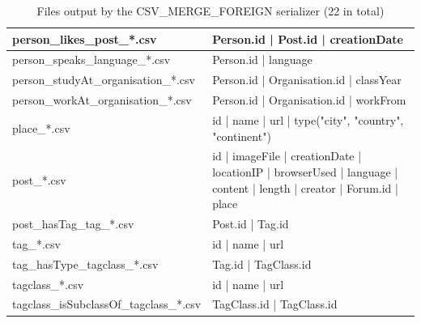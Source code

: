 \begin{table}[htbp]
{\begin{tabular}{|p{4.3cm}|p{12.4cm}|}
    	person\_likes\_post\_*.csv              & Person.id | Post.id | creationDate                                                                                  \\ \hline
    	person\_speaks\_language\_*.csv         & Person.id | language                                                                                                \\ \hline
    	person\_studyAt\_organisation\_*.csv    & Person.id | Organisation.id | classYear                                                                             \\ \hline
    	person\_workAt\_organisation\_*.csv     & Person.id | Organisation.id | workFrom                                                                              \\ \hline
    	place\_*.csv                            & id | name | url | type({"city", "country", "continent"})                                                            \\ \hline
    	post\_*.csv                             & id | imageFile | creationDate | locationIP | browserUsed | language | content | length | creator | Forum.id | place \\ \hline
    	post\_hasTag\_tag\_*.csv                & Post.id | Tag.id                                                                                                    \\ \hline
    	tag\_*.csv                              & id | name | url                                                                                                     \\ \hline
    	tag\_hasType\_tagclass\_*.csv           & Tag.id | TagClass.id                                                                                                \\ \hline
    	tagclass\_*.csv                         & id | name | url                                                                                                     \\ \hline
    	tagclass\_isSubclassOf\_tagclass\_*.csv & TagClass.id | TagClass.id                                                                                           \\ \hline
    \end{tabular}}
    \caption{Files output by the CSV\_MERGE\_FOREIGN serializer (22 in total)}
    \label{table:csv_merge_foreign}
\end{table}

